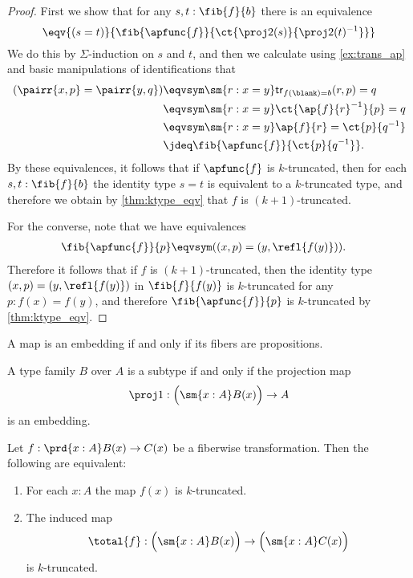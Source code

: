 \begin{proof}
First we show that for any $s,t:\fib{f}{b}$ there is an equivalence
\begin{equation*}
\eqv{(s=t)}{\fib{\apfunc{f}}{\ct{\proj 2(s)}{\proj 2(t)^{-1}}}}
\end{equation*}
We do this by $\Sigma$-induction on $s$ and $t$, and then we calculate using \cref{ex:trans_ap} and basic manipulations of identifications that
\begin{align*}
(\pairr{x,p}=\pairr{y,q}) & \eqvsym \sm{r:x=y} \mathsf{tr}_{f(\blank)=b}(r,p)=q \\
& \eqvsym \sm{r:x=y} \ct{\ap{f}{r}^{-1}}{p}=q \\
& \eqvsym \sm{r:x=y} \ap{f}{r}=\ct{p}{q^{-1}} \\
& \jdeq \fib{\apfunc{f}}{\ct{p}{q^{-1}}}.
\end{align*}
By these equivalences, it follows that if $\apfunc{f}$ is $k$-truncated, then for each $s,t:\fib{f}{b}$ the identity type $s=t$ is equivalent to a $k$-truncated type, and therefore we obtain by \cref{thm:ktype_eqv} that $f$ is $(k+1)$-truncated.

For the converse, note that we have equivalences
\begin{align*}
\fib{\apfunc{f}}{p} & \eqvsym ((x,p)=(y,\refl{f(y)})).
\end{align*}
Therefore it follows that if $f$ is $(k+1)$-truncated, then the identity type $(x,p)=(y,\refl{f(y)})$ in $\fib{f}{f(y)}$ is $k$-truncated for any $p:f(x)=f(y)$, and therefore $\fib{\apfunc{f}}{p}$ is $k$-truncated by \cref{thm:ktype_eqv}. 
\end{proof}

\begin{cor}
A map is an embedding if and only if its fibers are propositions.
\end{cor}

\begin{cor}\label{thm:subtype}
A type family $B$ over $A$ is a subtype if and only if the projection map
\begin{equation*}
\proj 1 : \Big(\sm{x:A}B(x)\Big)\to A
\end{equation*}
is an embedding.
\end{cor}

\begin{thm}
Let $f:\prd{x:A}B(x)\to C(x)$ be a fiberwise transformation. Then the following are equivalent:
\begin{enumerate}
\item For each $x:A$ the map $f(x)$ is $k$-truncated.
\item The induced map 
\begin{equation*}
\total{f}:\Big(\sm{x:A}B(x)\Big)\to\Big(\sm{x:A}C(x)\Big)
\end{equation*}
is $k$-truncated.
\end{enumerate}
\end{thm}

